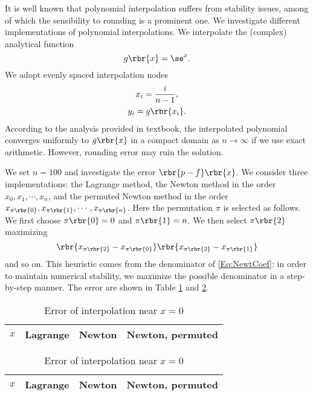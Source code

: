 \documentclass[english, nochinese]{pnote}
\begin{document}
It is well known that polynomial interpolation suffers from stability issues, among of which the sensibility to rounding is a prominent one. We investigate different implementations of polynomial interpolations. We interpolate the (complex) analytical function
\begin{equation}
g \rbr{x} = \se^x.
\end{equation}
We adopt evenly spaced interpolation nodes
\begin{gather}
x_i = \frac{i}{ n - 1 }, \\
y_i = g \rbr{x_i}.
\end{gather}
According to the analysis provided in textbook, the interpolated polynomial converges uniformly to $ g \rbr{x} $ in a compact domain as $ n \rightarrow \infty $ if we use exact arithmetic. However, rounding error may ruin the solution.

We set $ n = 100 $ and investigate the error $ \rbr{ p - f } \rbr{x} $. We consider three implementations: the Lagrange method, the Newton method in the order $ x_0, x_1, \cdots, x_n $, and the permuted Newton method in the order $ x_{ \pi \rbr{0} }, x_{ \pi \rbr{1} }, \cdots, x_{ \pi \rbr{n} } $. Here the permutation $\pi$ is selected as follows. We first choose $ \pi \rbr{0} = 0 $ and $ \pi \rbr{1} = n $. We then select $ \pi \rbr{2} $ maximizing
\begin{equation}
\rbr{ x_{ \pi \rbr{2} } - x_{ \pi \rbr{0} } } \rbr{ x_{ \pi \rbr{2} } - x_{ \pi \rbr{1} } }
\end{equation}
and so on. This heuristic comes from the denominator of \eqref{Eq:NewtCoef}: in order to maintain numerical stability, we maximize the possible denominator in a step-by-step manner. The error are shown in Table \ref{Tbl:ExpAt0} and \ref{Tbl:ExpAt1}.

\begin{table}
\centering
\begin{tabular}{|c|c|c|c|}
\hline
$x$ & Lagrange & Newton & Newton, permuted \\
\hline

\end{tabular}
\caption{Error of interpolation near $ x = 0 $}
\label{Tbl:ExpAt0}
\end{table}

\begin{table}
\centering
\begin{tabular}{|c|c|c|c|}
\hline
$x$ & Lagrange & Newton & Newton, permuted \\
\hline

\end{tabular}
\caption{Error of interpolation near $ x = 0 $}
\label{Tbl:ExpAt1}
\end{table}
\end{document}
